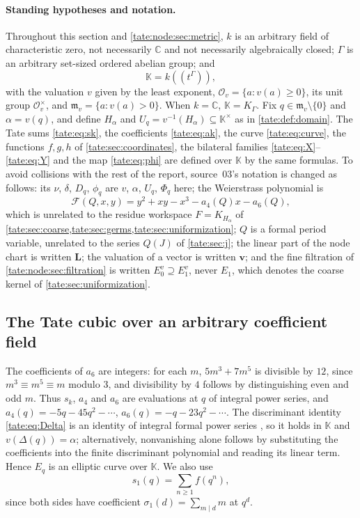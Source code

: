 \documentclass[11pt,letterpaper]{article}
\theoremstyle{definition}
\newcommand{\C}{\mathbb C}
\newcommand{\m}{\mathfrak m}
\newcommand{\OO}{\mathcal O}
\newcommand{\Fp}{\mathcal F}
\newcommand{\KK}{\mathbb K}
\newcommand{\bv}{\mathbf v}
\newcommand{\bL}{\mathbf L}
\begin{document}
\paragraph{Standing hypotheses and notation.}
Throughout this section and \cref{tate:node:sec:metric}, $k$ is an
arbitrary field of characteristic zero, not necessarily $\C$ and not
necessarily algebraically closed; $\Gamma$ is an arbitrary set-sized
ordered abelian group; and
\[
 \KK=k((t^\Gamma)),
\]
with the valuation $v$ given by the least exponent, $\OO_v=\{a:v(a)\ge0\}$,
its unit group $\OO_v^\times$, and $\m_v=\{a:v(a)>0\}$. When $k=\C$,
$\KK=K_\Gamma$. Fix $q\in\m_v\setminus\{0\}$ and $\alpha=v(q)$, and define
$H_\alpha$ and $U_q=v^{-1}(H_\alpha)\subseteq\KK^\times$ as in
\cref{tate:def:domain}. The Tate sums \eqref{tate:eq:sk}, the coefficients
\eqref{tate:eq:ak}, the curve \eqref{tate:eq:curve}, the functions
$f,g,h$ of \cref{tate:sec:coordinates}, the bilateral families
\eqref{tate:eq:X}--\eqref{tate:eq:Y} and the map \eqref{tate:eq:phi} are
defined over $\KK$ by the same formulas. To avoid collisions with the rest
of the report, source~03's notation is changed as follows: its $\nu$,
$\delta$, $D_q$, $\phi_q$ are $v$, $\alpha$, $U_q$, $\Phi_q$ here; the
Weierstrass polynomial is
\[
 \Fp(Q,x,y)=y^2+xy-x^3-a_4(Q)x-a_6(Q),
\]
which is unrelated to the residue workspace $F=K_{H_\alpha}$ of
\cref{tate:sec:coarse,tate:sec:germs,tate:sec:uniformization}; $Q$ is a
formal period variable, unrelated to the series $Q(J)$ of
\cref{tate:sec:j}; the linear part of the node chart is written $\bL$; the
valuation of a vector is written $\bv$; and the fine filtration of
\cref{tate:node:sec:filtration} is written $E^v_0\supseteq E^v_1$, never
$E_1$, which denotes the coarse kernel of \cref{tate:sec:uniformization}.

\subsection{The Tate cubic over an arbitrary coefficient field}

The coefficients of $a_6$ are integers: for each $m$, $5m^3+7m^5$ is
divisible by $12$, since $m^3\equiv m^5\equiv m$ modulo $3$, and
divisibility by $4$ follows by distinguishing even and odd $m$. Thus $s_k$,
$a_4$ and $a_6$ are evaluations at $q$ of integral power series, and
$a_4(q)=-5q-45q^2-\cdots$, $a_6(q)=-q-23q^2-\cdots$. The discriminant
identity \eqref{tate:eq:Delta} is an identity of integral formal power
series \cite{Tate}, so it holds in $\KK$ and $v(\Delta(q))=\alpha$;
alternatively, nonvanishing alone follows by substituting the coefficients
into the finite discriminant polynomial and reading its linear term. Hence
$E_q$ is an elliptic curve over $\KK$. We also use
\begin{equation}
 s_1(q)=\sum_{n\ge1}f(q^n),\label{tate:node:eq:s1-f}
\end{equation}
since both sides have coefficient $\sigma_1(d)=\sum_{m\mid d}m$ at $q^d$.
\end{document}
